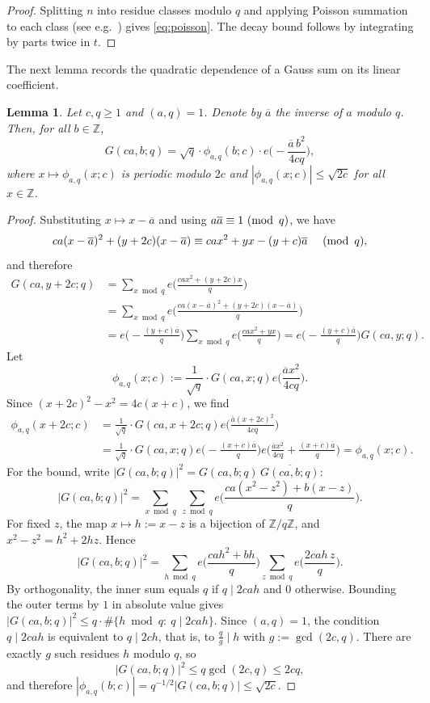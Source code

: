 \documentclass[a4paper,reqno,12pt]{amsart}
\theoremstyle{plain}
\newtheorem{lemma}[theorem]{Lemma}
\theoremstyle{plain}
\theoremstyle{remark}
\theoremstyle{plain}
\newcommand{\Z}{\mathbb{Z}}
\newcommand{\mymod}[1]{{\, \, ({\rm mod} \ \, #1)}}
\theoremstyle{plain}
\theoremstyle{plain}
\begin{document}
{\begin{proof}
Splitting $n$ into residue classes modulo $q$ and applying Poisson
summation to each class (see e.g.\ \cite[\S4.3]{IK}) gives
\eqref{eq:poisson}. The decay bound follows by integrating by parts
twice in $t$.
\end{proof}

The next lemma records the quadratic dependence of a Gauss sum on its
linear coefficient.
 
\begin{lemma}\label{lem:gaussphase}
Let $c, q \geq 1$ and $(a,q) = 1$. Denote by $\overline{a}$ the inverse
of $a$ modulo $q$. Then, for all $b \in \mathbb{Z}$, 
\[
G(ca,b;q)=\sqrt q \cdot \phi_{a,q}(b;c) \cdot e\Big(-\frac{\overline a\,b^2}{4cq}\Big),
\]
where $x \mapsto \phi_{a,q}(x; c)$ is periodic modulo $2c$ and
$|\phi_{a,q}(x; c)|\leq \sqrt{2c}$ for all $x \in \mathbb{Z}$.
\end{lemma}

\begin{proof}
Substituting $x\mapsto x-\overline a$ and using $a\overline a\equiv1\mymod q$,
we have
\[
ca(x-\overline a)^2+(y+2c)(x-\overline a)\equiv cax^2+yx-(y+c)\overline a \quad
\mymod q,
\]
and therefore
\begin{align*}
G(ca, y + 2c; q) & = \sum_{x \bmod{q}} e \Big ( \frac{ca x^2 + (y + 2 c) x}{q} \Big ) \\
& = \sum_{x \bmod{q}} e \Big ( \frac{ca (x - \overline{a})^2 + (y + 2 c) (x - \overline{a})}{q} \Big ) \\
& = e \Big ( - \frac{(y + c) \overline{a}}{q} \Big ) \sum_{x \bmod{q}} e \Big ( \frac{ca x^2 + y x}{q} \Big )
= e \Big ( - \frac{(y + c) \overline{a}}{q} \Big ) G(ca, y; q).
\end{align*}
Let
\[
\phi_{a,q}(x;c) := \frac{1}{\sqrt{q}} \cdot G(ca, x; q) e \Big ( \frac{\overline{a} x^2}{4 c q} \Big ).
\]
Since $(x+2c)^2-x^2=4c(x+c)$, we find
\begin{align*}
\phi_{a,q}(x + 2c;c) & = \frac{1}{\sqrt{q}} \cdot G(ca, x + 2c; q) e \Big ( \frac{\overline{a} (x + 2c)^2}{4 c q} \Big ) \\
& = \frac{1}{\sqrt{q}} \cdot G(ca, x; q) e \Big ( -\frac{(x + c) \overline{a}}{q} \Big )
e \Big ( \frac{\overline{a} x^2}{4cq}+\frac{(x+c)\overline a}{q} \Big )
= \phi_{a,q}(x;c).
\end{align*}
For the bound, write $|G(ca,b;q)|^2=G(ca,b;q)\,\overline{G(ca,b;q)}$:
\[
|G(ca,b;q)|^2=\sum_{x\bmod q}\ \sum_{z\bmod q}
e\Big(\frac{ca(x^2-z^2)+b(x-z)}{q}\Big).
\]
For fixed $z$, the map $x\mapsto h:=x-z$ is a bijection of $\Z/q\Z$, and
$x^2-z^2=h^2+2hz$. Hence
\[
|G(ca,b;q)|^2=\sum_{h\bmod q}e\Big(\frac{cah^2+bh}{q}\Big)
\sum_{z\bmod q}e\Big(\frac{2cah\,z}{q}\Big).
\]
By orthogonality, the inner sum equals $q$ if $q\mid 2cah$ and $0$
otherwise. Bounding the outer terms by $1$ in absolute value gives
$|G(ca,b;q)|^2\le q\cdot\#\{h\bmod q:\ q\mid 2cah\}$.
Since $(a,q)=1$, the condition $q\mid 2cah$ is equivalent to
$q\mid 2ch$, that is, to $\frac{q}{g}\mid h$ with $g:=\gcd(2c,q)$. There
are exactly $g$ such residues $h$ modulo $q$, so
\[
|G(ca,b;q)|^2\le q\gcd(2c,q)\le 2cq,
\]
and therefore $|\phi_{a,q}(b;c)|=q^{-1/2}|G(ca,b;q)|\le\sqrt{2c}$.
\end{proof}

}
\end{document}
